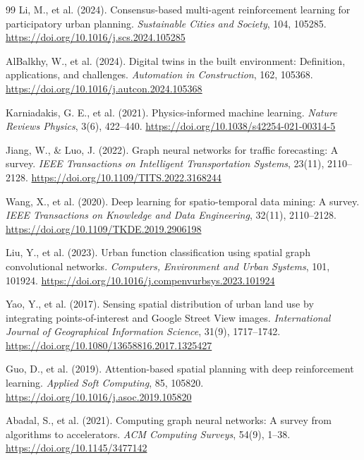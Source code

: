 \documentclass[final,3p,times]{elsarticle}
\begin{document}
\begin{thebibliography}{99}
Li, M., et al. (2024). Consensus-based multi-agent reinforcement learning for participatory urban planning. \textit{Sustainable Cities and Society}, 104, 105285. \href{https://doi.org/10.1016/j.scs.2024.105285}{https://doi.org/10.1016/j.scs.2024.105285}

AlBalkhy, W., et al. (2024). Digital twins in the built environment: Definition, applications, and challenges. \textit{Automation in Construction}, 162, 105368. \href{https://doi.org/10.1016/j.autcon.2024.105368}{https://doi.org/10.1016/j.autcon.2024.105368}

Karniadakis, G. E., et al. (2021). Physics-informed machine learning. \textit{Nature Reviews Physics}, 3(6), 422--440. \href{https://doi.org/10.1038/s42254-021-00314-5}{https://doi.org/10.1038/s42254-021-00314-5}

Jiang, W., \& Luo, J. (2022). Graph neural networks for traffic forecasting: A survey. \textit{IEEE Transactions on Intelligent Transportation Systems}, 23(11), 2110--2128. \href{https://doi.org/10.1109/TITS.2022.3168244}{https://doi.org/10.1109/TITS.2022.3168244}

Wang, X., et al. (2020). Deep learning for spatio-temporal data mining: A survey. \textit{IEEE Transactions on Knowledge and Data Engineering}, 32(11), 2110--2128. \href{https://doi.org/10.1109/TKDE.2019.2906198}{https://doi.org/10.1109/TKDE.2019.2906198}

Liu, Y., et al. (2023). Urban function classification using spatial graph convolutional networks. \textit{Computers, Environment and Urban Systems}, 101, 101924. \href{https://doi.org/10.1016/j.compenvurbsys.2023.101924}{https://doi.org/10.1016/j.compenvurbsys.2023.101924}

Yao, Y., et al. (2017). Sensing spatial distribution of urban land use by integrating points-of-interest and Google Street View images. \textit{International Journal of Geographical Information Science}, 31(9), 1717--1742. \href{https://doi.org/10.1080/13658816.2017.1325427}{https://doi.org/10.1080/13658816.2017.1325427}

Guo, D., et al. (2019). Attention-based spatial planning with deep reinforcement learning. \textit{Applied Soft Computing}, 85, 105820. \href{https://doi.org/10.1016/j.asoc.2019.105820}{https://doi.org/10.1016/j.asoc.2019.105820}

Abadal, S., et al. (2021). Computing graph neural networks: A survey from algorithms to accelerators. \textit{ACM Computing Surveys}, 54(9), 1--38. \href{https://doi.org/10.1145/3477142}{https://doi.org/10.1145/3477142}

\end{thebibliography}
\end{document}
